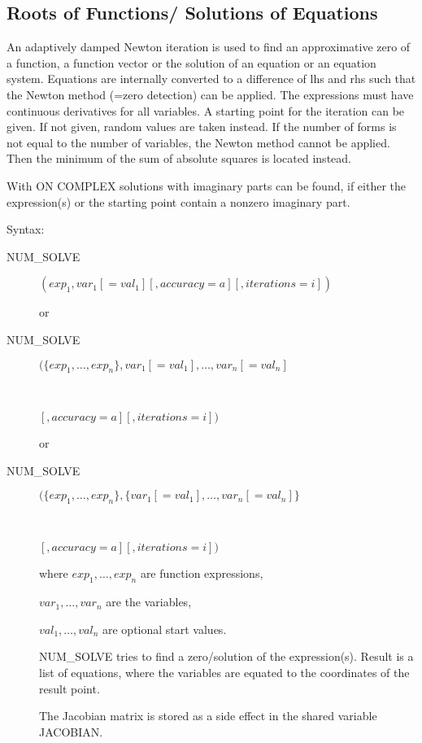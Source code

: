 \subsection{Roots of Functions/ Solutions of Equations}

An adaptively damped Newton iteration is used to find
an approximative zero of a function, a function vector or the solution
of an equation or an equation system. Equations are
internally converted to a difference of lhs and rhs such
that the Newton method (=zero detection) can be applied. The expressions
must have continuous derivatives for all variables.
A starting point for the iteration can be given. If not given,
random values are taken instead. If the number of
forms is not equal to the number of variables, the
Newton method cannot be applied. Then the minimum
of the sum of absolute squares is located instead.

With ON COMPLEX solutions with imaginary parts can be
found, if either the expression(s) or the starting point
contain a nonzero imaginary part.

Syntax:

\begin{description}
\item[NUM\_SOLVE]  $(exp_1, var_1[=val_1][,accuracy=a][,iterations=i])$

or

\item[NUM\_SOLVE]  $(\{exp_1,\ldots,exp_n\},
   var_1[=val_1],\ldots,var_n[=val_n]$
\item[\ \ \ \ \ \ \ \ ]$[,accuracy=a][,iterations=i])$

or

\item[NUM\_SOLVE]  $(\{exp_1,\ldots,exp_n\},
   \{var_1[=val_1],\ldots,var_n[=val_n]\}$
\item[\ \ \ \ \ \ \ \ ]$[,accuracy=a][,iterations=i])$

where $exp_1, \ldots,exp_n$ are function expressions,

      $var_1, \ldots, var_n$ are the variables,

      $val_1, \ldots, val_n$ are optional start values.

NUM\_SOLVE tries to find a zero/solution of the expression(s).
Result is a list of equations, where the variables are
equated to the coordinates of the result point.

The Jacobian matrix is stored as a side effect in the shared
variable JACOBIAN.

\end{description}

